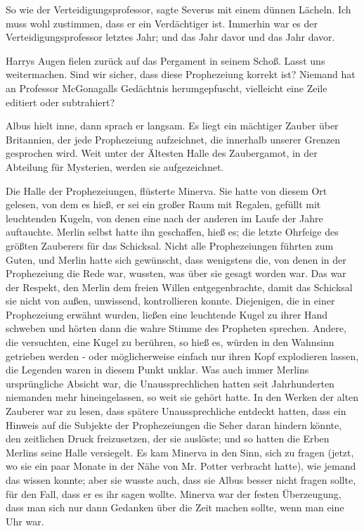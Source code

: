 \glqq{}So wie der Verteidigungsprofessor\grqq{}, sagte Severus mit einem dünnen
Lächeln. \glqq{}Ich muss wohl zustimmen, dass er ein Verdächtiger ist. Immerhin
war es der Verteidigungsprofessor letztes Jahr; und das Jahr davor und das Jahr
davor.\grqq{}

Harrys Augen fielen zurück auf das Pergament in seinem Schoß. \glqq{}Lasst uns
weitermachen. Sind wir sicher, dass diese Prophezeiung korrekt ist? Niemand hat
an Professor McGonagalls Gedächtnis herumgepfuscht, vielleicht eine Zeile
editiert oder subtrahiert?\grqq{}

Albus hielt inne, dann sprach er langsam. \glqq{}Es liegt ein mächtiger Zauber
über Britannien, der jede Prophezeiung aufzeichnet, die innerhalb unserer
Grenzen gesprochen wird. Weit unter der Ältesten Halle des Zaubergamot, in der
Abteilung für Mysterien, werden sie aufgezeichnet.\grqq{}

\glqq{}Die Halle der Prophezeiungen\grqq{}, flüsterte Minerva. Sie hatte von
diesem Ort gelesen, von dem es hieß, er sei ein großer Raum mit Regalen, gefüllt
mit leuchtenden Kugeln, von denen eine nach der anderen im Laufe der Jahre
auftauchte. Merlin selbst hatte ihn geschaffen, hieß es; die letzte Ohrfeige des
größten Zauberers für das Schicksal. Nicht alle Prophezeiungen führten zum
Guten, und Merlin hatte sich gewünscht, dass wenigstens die, von denen in der
Prophezeiung die Rede war, wussten, was über sie gesagt worden war. Das war der
Respekt, den Merlin dem freien Willen entgegenbrachte, damit das Schicksal sie
nicht von außen, unwissend, kontrollieren konnte. Diejenigen, die in einer
Prophezeiung erwähnt wurden, ließen eine leuchtende Kugel zu ihrer Hand schweben
und hörten dann die wahre Stimme des Propheten sprechen. Andere, die versuchten,
eine Kugel zu berühren, so hieß es, würden in den Wahnsinn getrieben werden -
oder möglicherweise einfach nur ihren Kopf explodieren lassen, die Legenden
waren in diesem Punkt unklar. Was auch immer Merlins ursprüngliche Absicht war,
die Unaussprechlichen hatten seit Jahrhunderten niemanden mehr hineingelassen,
so weit sie gehört hatte. In den Werken der alten Zauberer war zu lesen, dass
spätere Unaussprechliche entdeckt hatten, dass ein Hinweis auf die Subjekte der
Prophezeiungen die Seher daran hindern könnte, den zeitlichen Druck
freizusetzen, der sie auslöste; und so hatten die Erben Merlins seine Halle
versiegelt. Es kam Minerva in den Sinn, sich zu fragen (jetzt, wo sie ein paar
Monate in der Nähe von Mr. Potter verbracht hatte), wie jemand das wissen
konnte; aber sie wusste auch, dass sie Albus besser nicht fragen sollte, für den
Fall, dass er es ihr sagen wollte. Minerva war der festen Überzeugung, dass man
sich nur dann Gedanken über die Zeit machen sollte, wenn man eine Uhr war.

